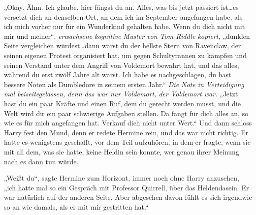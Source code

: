 „Okay. Ähm. Ich glaube, hier fängst du an. Alles, was bis jetzt passiert ist…es versetzt dich an denselben Ort, an dem ich im September angefangen habe, als ich mich vorher nur für ein Wunderkind gehalten habe. Wenn du dich nicht mit mir und meiner“, \emph{erwachsene kognitive Muster von Tom Riddle kopiert,} „dunklen Seite vergleichen würdest…dann wärst du der hellste Stern von Ravenclaw, der seinen eigenen Protest organisiert hat, um gegen Schultyrannen zu kämpfen und seinen Verstand unter dem Angriff von Voldemort bewahrt hat, und das alles, während du erst zwölf Jahre alt warst. Ich habe es nachgeschlagen, du hast bessere Noten als Dumbledore in seinem ersten Jahr.“ \emph{Die Note in Verteidigung mal beiseitegelassen, denn das war nur Voldemort, der Voldemort war.} „Jetzt hast du ein paar Kräfte und einen Ruf, dem du gerecht werden musst, und die Welt wird dir ein paar schwierige Aufgaben stellen. Da fängt für dich alles an, so wie es für mich angefangen hat. Verkauf dich nicht unter Wert.“ Und dann schloss Harry fest den Mund, denn er redete Hermine rein, und das war nicht richtig.
Er hatte es wenigstens geschafft, vor dem Teil aufzuhören, in dem er fragte, wenn sie mit all dem, was sie hatte, keine Heldin sein konnte, wer genau ihrer Meinung nach es dann tun würde.

„Weißt du“, sagte Hermine zum Horizont, immer noch ohne Harry anzusehen, „ich hatte mal so ein Gespräch mit Professor Quirrell, über das Heldendasein. Er war natürlich auf der anderen Seite. Aber abgesehen davon fühlt es sich irgendwie so an wie damals, als er mit mir gestritten hat.“


